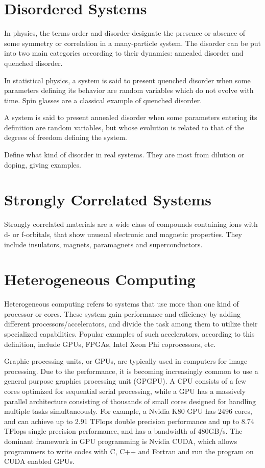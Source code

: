 \section{Disordered Systems}
In physics, the terms order and disorder designate the presence or absence of 
some symmetry or correlation in a many-particle system. 
The disorder can be put into two main categories according to their dynamics: 
annealed disorder and quenched disorder.

In statistical physics, a system is said to present quenched disorder when 
some parameters defining its behavior are random variables which do not evolve 
with time. Spin glasses are a classical example of quenched disorder.

A system is said to present annealed disorder when some parameters entering 
its definition are random variables, but whose evolution is related to that 
of the degrees of freedom defining the system.

Define what kind of disorder in real systems. They are most from dilution or 
doping, giving examples. 

\section{Strongly Correlated Systems}
Strongly correlated materials are a wide class of compounds containing ions 
with d- or f-orbitals, that show unusual electronic and magnetic properties. 
They include insulators, magnets, paramagnets and superconductors.

\section{Heterogeneous Computing}
Heterogeneous computing refers to systems that use more than one kind of 
processor or cores. These system gain performance and efficiency by adding
different processors/accelerators, and divide the task among them to utilize 
their specialized capabilities. 
Popular examples of such accelerators, according to this definition, include 
GPUs, FPGAs, Intel Xeon Phi coprocessors, etc.


Graphic processing units, or GPUs, are typically used in computers for image 
processing. 
Due to the performance, it is becoming increasingly common to use a general purpose 
graphics processing unit (GPGPU).
A CPU consists of a few cores optimized for sequential serial processing,
while a GPU has a massively parallel architecture 
consisting of thousands of small cores designed for handling multiple tasks 
simultaneously.
For example, a Nvidia K80 GPU has 2496 cores, and can achieve up to 2.91 TFlops 
double precision performance and up to 8.74 TFlops single precision performance, 
and has a bandwidth of 480GB/s.
The dominant framework in GPU programming is Nvidia CUDA, which allows 
programmers to write codes with C, C++ and Fortran and run the program on CUDA
enabled GPUs.


